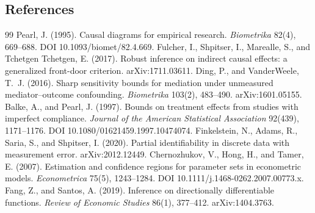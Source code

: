 \documentclass[11pt]{article}
\theoremstyle{definition}
\theoremstyle{plain}
\theoremstyle{remark}
\begin{document}
\subsection*{References}
\begin{thebibliography}{99}
 Pearl, J. (1995). Causal diagrams for empirical research.
  \textit{Biometrika} 82(4), 669--688. DOI 10.1093/biomet/82.4.669.
 Fulcher, I., Shpitser, I., Marealle, S.,
  and Tchetgen Tchetgen, E. (2017). Robust inference on indirect causal effects: a generalized front-door
  criterion. arXiv:1711.03611.
 Ding, P., and VanderWeele, T.~J. (2016). Sharp
  sensitivity bounds for mediation under unmeasured mediator--outcome confounding. \textit{Biometrika}
  103(2), 483--490. arXiv:1601.05155.
 Balke, A., and Pearl, J. (1997). Bounds on treatment effects from studies
  with imperfect compliance. \textit{Journal of the American Statistical Association} 92(439), 1171--1176.
  DOI 10.1080/01621459.1997.10474074.
 Finkelstein, N., Adams, R., Saria, S., and
  Shpitser, I. (2020). Partial identifiability in discrete data with measurement error. arXiv:2012.12449.
 Chernozhukov, V., Hong, H., and Tamer, E. (2007).
  Estimation and confidence regions for parameter sets in econometric models. \textit{Econometrica} 75(5),
  1243--1284. DOI 10.1111/j.1468-0262.2007.00773.x.
 Fang, Z., and Santos, A. (2019). Inference on
  directionally differentiable functions. \textit{Review of Economic Studies} 86(1), 377--412.
  arXiv:1404.3763.
\end{thebibliography}
\end{document}
